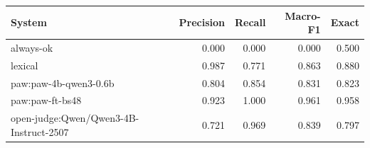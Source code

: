 \begin{tabular}{lrrrr}
\toprule
System & Precision & Recall & Macro-F1 & Exact \\
\midrule
always-ok & 0.000 & 0.000 & 0.000 & 0.500 \\
lexical & 0.987 & 0.771 & 0.863 & 0.880 \\
paw:paw-4b-qwen3-0.6b & 0.804 & 0.854 & 0.831 & 0.823 \\
paw:paw-ft-bs48 & 0.923 & 1.000 & 0.961 & 0.958 \\
open-judge:Qwen/Qwen3-4B-Instruct-2507 & 0.721 & 0.969 & 0.839 & 0.797 \\
\bottomrule
\end{tabular}
